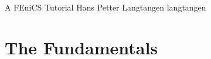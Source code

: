 

\newcommand{\langtangenrefeq}[1]{(\ref{#1})}
\newcommand{\langtangenep}{\thinspace . }

\newcommand{\langtangenmathbfx}[1]{{\mbox{\boldmath $#1$}}}
\newcommand{\langtangenxpoint}{\langtangenmathbfx{x}}
\newcommand{\langtangennormalvec}{\langtangenmathbfx{n}}

\newcommand{\langtangencodett}[1]{{\rm\texttt{#1}}}

\newcommand{\langtangenidx}[1]{\index{#1@\langtangencodett{#1}}}


              {A FEniCS Tutorial}
              {Hans Petter Langtangen}
              {langtangen}

\label{langtangen:main}

\newcommand{\hpl}[1]{}


\section{The Fundamentals}
\label{langtangen:fundamentals}

